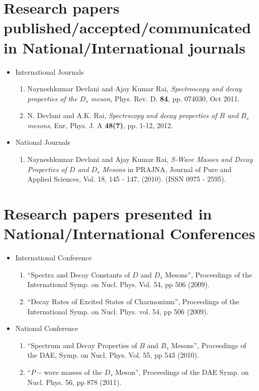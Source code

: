 \documentclass[draft,11pt]{scrreprt}
\begin{document}
\chapter*{Research papers published/accepted/communicated in National/International journals}
\begin{itemize}
\item International Journals
\begin{enumerate}
\item Nayneshkumar Devlani and Ajay Kumar Rai, \textit{Spectroscopy and decay properties of the $D_s$ meson}, Phys. Rev. D. \textbf{84}, pp. 074030, Oct 2011.
\item N. Devlani and A.K. Rai, \textit{Spectrscopy and decay properties of $B$ and $B_s$ mesons}, Eur, Phys. J. A \textbf{48(7)}, pp. 1-12, 2012.
\end{enumerate}
\item National Journals

\begin{enumerate}
\item Nayneshkumar Devlani and Ajay Kumar Rai, \textit{S-Wave Masses and Decay Properties of $D$ and $D_s$ Mesons} in PRAJNA,
Journal of Pure and Applied Sciences, Vol. 18, 145 - 147, (2010). (ISSN 0975 -
2595).

\end{enumerate}
\end{itemize}

\chapter*{Research papers presented in National/International Conferences}

\begin{itemize}
\item International Conference
\begin{enumerate}
\item ``Spectra and Decay Constants of $D$ and $D_s$ Mesons'', Proceedings of the International Symp. on Nucl. Phys. Vol. 54, pp 506 (2009).

\item ``Decay Rates of Excited States of Charmonium'', Proceedings of the International Symp. on Nucl. Phys. vol. 54, pp 506 (2009).
\end{enumerate}
\item National Conference
\begin{enumerate}
\item ``Spectrum and Decay Properties of $B$ and $B_s$ Mesons'', Proceedings of the DAE, Symp. on Nucl. Phys. Vol. 55, pp 543 (2010).



\item \enquote{$P-$wave masses of the $D_s$ Meson}, Proceedings of the DAE Symp. on Nucl. Phys. 56, pp 878 (2011).
\end{enumerate}
\end{itemize}


\end{document}
